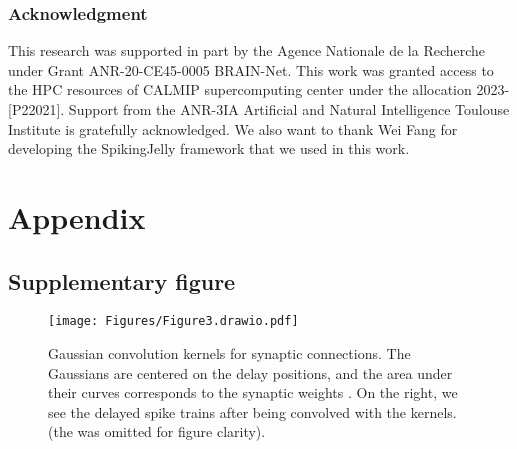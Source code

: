 \documentclass{article} \usepackage{iclr2024_conference,times}
\begin{document}
\begin{comment}
\subsubsection*{Limitations}
The primary limitations of our work revolve around the compatibility and constraints of our delay learning method. Specifically, our method is limited to offline training conducted in discrete-time simulations, and it cannot handle recurrent connections. Additionally, a maximum delay limit, which corresponds to the size of the kernel, must be predetermined and fixed before the learning process.

\subsubsection*{Computational resources}
This project required about 500 GPU hours on a single Nvidia Tesla T4 GPU with two Intel(R) Xeon(R) CPUs @ 2.20 GHz threads. Given this hardware configuration, a single training session lasted approximately 1 hour for the SHD runs, while for the SSC/GSC runs, a single training session lasted around 7 hours. The available computing resources allowed us to perform the required calculations efficiently, leading to accurate and competitive outcomes within a reasonable time.
\end{comment}

\subsubsection*{Acknowledgment}

This research was supported in part by the Agence Nationale de la Recherche under Grant ANR-20-CE45-0005 BRAIN-Net. This work was granted access to the HPC resources of CALMIP supercomputing center under the allocation 2023-[P22021]. Support from the ANR-3IA Artificial and Natural Intelligence Toulouse Institute is gratefully acknowledged. We also want to thank Wei Fang for developing the SpikingJelly framework that we used in this work.





\newpage
\appendix
\section{Appendix}
\subsection{Supplementary figure}
\begin{figure}[!ht]

  \centering
  \texttt{[image: Figures/Figure3.drawio.pdf]}
  \caption{Gaussian convolution kernels for  synaptic connections. The Gaussians are centered on the delay positions, and the area under their curves corresponds to the synaptic weights . On the right, we see the delayed spike trains after being convolved with the kernels. (the  was omitted for figure clarity).}
  \label{fig:methods_fig2}
\end{figure}
\end{document}
